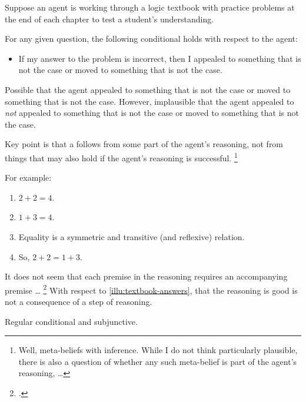 \begin{note}
  \begin{illustration}
    \label{illu:textbook-answers}
    Suppose an agent is working through a logic textbook with practice problems at the end of each chapter to test a student's understanding.

    For any given question, the following conditional holds with respect to the agent:
    \begin{itemize}
    \item If my answer to the problem is incorrect, then I {\color{red} appealed to something that is not the case or moved to something that is not the case}.
    \end{itemize}
  \end{illustration}
  Possible that the agent {\color{red} appealed to something that is not the case or moved to something that is not the case}.
  However, implausible that the agent appealed to \emph{not} {\color{red} appealed to something that is not the case or moved to something that is not the case}.

  Key point is that a \requ{} follows from some part of the agent's reasoning, not from things that may also hold if the agent's reasoning is successful.\nolinebreak
  \footnote{
    Well, meta-beliefs with inference.
    While I do not think particularly plausible, there is also a question of whether any such meta-belief is part of the agent's reasoning, \dots
  }

  For example:
  \begin{enumerate}
  \item \(2 + 2 = 4\).
  \item \(1 + 3 = 4\).
  \item Equality is a symmetric and transitive (and reflexive) relation.
  \item So, \(2 + 2 = 1 + 3\).
  \end{enumerate}
  It does not seem that each premise in the reasoning requires an accompanying premise \dots\nolinebreak
  \footnote{
    \textcite{Carroll:1895uj}.
  }
  With respect to \autoref{illu:textbook-answers}, that the reasoning is good is not a consequence of a step of reasoning.
\end{note}

\begin{note}
  Regular conditional and subjunctive.
\end{note}

